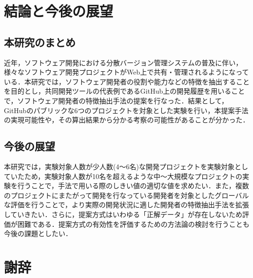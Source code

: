 \documentclass{funthesis}
\begin{document}
\chapter{結論と今後の展望}

\section{本研究のまとめ}
近年，ソフトウェア開発における分散バージョン管理システムの普及に伴い，様々なソフトウェア開発プロジェクトがWeb上で共有・管理されるようになっている．本研究では，ソフトウェア開発者の役割や能力などの特徴を抽出することを目的とし，共同開発ツールの代表例であるGitHub上の開発履歴を用いることで，ソフトウェア開発者の特徴抽出手法の提案を行なった．結果として，GitHubのパブリックな6つのプロジェクトを対象とした実験を行い，本提案手法の実現可能性や，その算出結果から分かる考察の可能性があることが分かった．
\section{今後の展望}
本研究では，実験対象人数が少人数(4〜6名)な開発プロジェクトを実験対象としていたため，実験対象人数が10名を超えるような中〜大規模なプロジェクトの実験を行うことで，手法で用いる際のしきい値の適切な値を求めたい．また，複数のプロジェクトにまたがって開発を行なっている開発者を対象としたグローバルな評価を行うことで，より実際の開発状況に適した開発者の特徴抽出手法を拡張していきたい．さらに，提案方式はいわゆる「正解データ」が存在しないため評価が困難である．提案方式の有効性を評価するための方法論の検討を行うことも今後の課題としたい．
\chapter*{謝辞}
\end{document}
